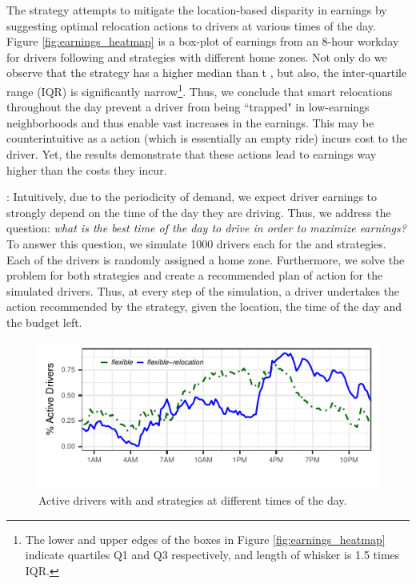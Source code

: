 The {\relocation} strategy attempts to mitigate the location-based disparity in earnings by suggesting optimal relocation actions to drivers at various times of the day. Figure \ref{fig:earnings_heatmap} is a box-plot of earnings from an 8-hour workday for drivers following {\naive} and {\relocation} strategies with different home zones. Not only do we observe that the {\relocation} strategy has a higher median than t {\naive}, but also, the inter-quartile range (IQR) is significantly narrow\footnote{The lower and upper edges of the boxes in Figure \ref{fig:earnings_heatmap} indicate quartiles Q1 and Q3 respectively, and length of whisker is 1.5 times IQR.}. Thus, we conclude that smart relocations throughout the day prevent a driver from being ``trapped" in low-earnings neighborhoods and 
thus enable vast increases in the earnings. 
This may be counterintuitive as a {\relocate} action (which is essentially an empty ride) incurs cost to the driver. Yet, the results demonstrate that 
these actions lead to earnings way higher than the costs they incur.

: Intuitively, due to the periodicity of demand, we expect driver earnings to strongly depend on the time of the day they are driving. 
Thus, we address the question: \textit{what is the best time of the day to drive in order to maximize earnings?} To answer this question, we simulate 1000 drivers each for the {\flexible} and {\relocationflexible} strategies. Each of the drivers is randomly assigned a home zone. Furthermore, we solve the {\originalproblem} problem for both strategies and create a recommended plan of action for the simulated drivers. Thus, at every step of the simulation, a driver undertakes the action recommended by the strategy, given the location, the time of the day and the budget left.

\begin{figure}
	\centering
	\includegraphics{figures/simulated_schedules.pdf}
	\caption{Active drivers with {\flexible} and {\relocationflexible}
	strategies at different times of the day.}
	\label{fig:simulated_schedules}
\end{figure}

